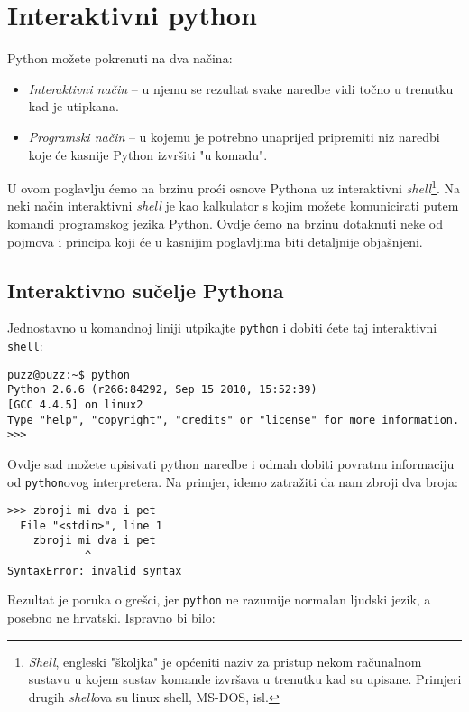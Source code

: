 \chapter{Interaktivni python}

Python možete pokrenuti na dva načina:

\begin{itemize}
	\item \emph{Interaktivni način} -- u njemu se rezultat svake naredbe vidi
		točno u trenutku kad je utipkana.
	\item \emph{Programski način} -- u kojemu je potrebno unaprijed pripremiti
		niz naredbi koje će kasnije Python izvršiti "u komadu".
\end{itemize}

U ovom poglavlju ćemo na brzinu proći osnove Pythona uz interaktivni
\emph{shell}\footnote{\emph{Shell}, engleski "školjka" je općeniti naziv za pristup
nekom računalnom sustavu u kojem sustav komande izvršava u trenutku kad su upisane.
Primjeri drugih \emph{shell}ova su linux shell, MS-DOS, isl.}. Na neki način
interaktivni \emph{shell} je kao kalkulator s kojim možete komunicirati putem komandi
programskog jezika Python. Ovdje ćemo na brzinu
dotaknuti neke od pojmova i principa koji će u kasnijim poglavljima biti detaljnije
objašnjeni.

\section{Interaktivno sučelje Pythona}

Jednostavno u komandnoj liniji utpikajte \verb+python+ i dobiti ćete taj interaktivni
\verb+shell+:

\begin{verbatim}
puzz@puzz:~$ python
Python 2.6.6 (r266:84292, Sep 15 2010, 15:52:39) 
[GCC 4.4.5] on linux2
Type "help", "copyright", "credits" or "license" for more information.
>>> 
\end{verbatim}

Ovdje sad možete upisivati python naredbe i odmah dobiti povratnu informaciju od \verb+python+ovog
interpretera. Na primjer, idemo zatražiti da nam zbroji dva broja:

\begin{verbatim}
>>> zbroji mi dva i pet
  File "<stdin>", line 1
    zbroji mi dva i pet
            ^
SyntaxError: invalid syntax
\end{verbatim}

Rezultat je poruka o grešci, jer \verb+python+ ne razumije normalan ljudski jezik, a posebno ne
hrvatski. Ispravno bi bilo:

